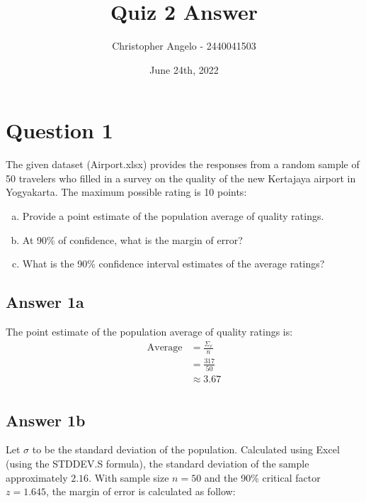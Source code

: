 \documentclass[
	11pt, %
]{assignment}
\author{Christopher Angelo - 2440041503}
\institute{BINUS University\\ Global Class}
\date{June 24th, 2022}
\title{Quiz 2 Answer}
\newcommand{\fixedwidth}[1]{{\fontfamily{cmtt}\selectfont #1}} %
\begin{document}
\maketitle


\section*{Question 1}

\begin{problem}
The given dataset (Airport.xlsx) provides the responses from a random sample of 50 travelers who filled in a survey on the quality of the new Kertajaya airport in Yogyakarta. The maximum possible rating is 10 points:

\begin{enumerate}[a.]
	\item Provide a point estimate of the population average of quality ratings.
	\item At 90\% of confidence, what is the margin of error?
	\item What is the 90\% confidence interval estimates of the average ratings?
\end{enumerate}
\end{problem}

\subsection*{Answer 1a}

The point estimate of the population average of quality ratings is:
\[
	\begin{aligned}
		\text{Average} & = \frac{\Sigma_x}{n} \\
		               & = \frac{317}{50}     \\
		               & \approx 3.67         \\
	\end{aligned}
\]

\subsection*{Answer 1b}

Let \( \sigma \) to be the standard deviation of the population. Calculated using Excel (using the \fixedwidth{STDDEV.S} formula), the standard deviation of the sample approximately \(2.16\). With sample size \(n=50\) and the 90\% critical factor \(z=1.645\), the margin of error is calculated as follow:
\end{document}

